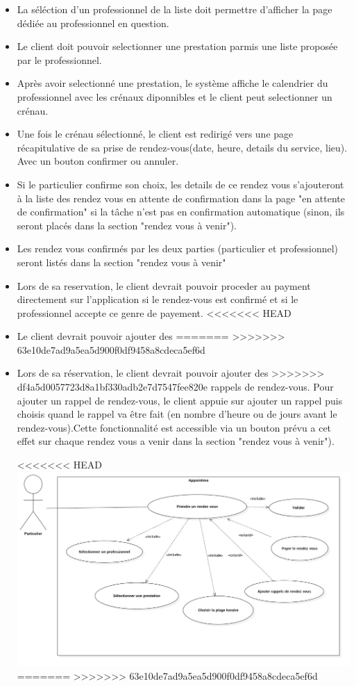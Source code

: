 \documentclass{article}
\begin{document}
\begin{itemize}
\begin{itemize}
\item La séléction d'un
  professionnel de la liste doit permettre d'afficher la
  page dédiée au professionnel en question.
\item Le client doit pouvoir selectionner une prestation parmis une liste
  proposée par le professionnel.
\item Après avoir selectionné une prestation, le système affiche le
  calendrier du professionnel avec les crénaux diponnibles et le
  client peut selectionner un crénau.
\item Une fois le crénau sélectionné, le client est redirigé vers
    une page récapitulative de sa prise de rendez-vous(date, heure, details du service, lieu). Avec un bouton
    confirmer ou annuler.
\item Si le particulier confirme son choix, les details de ce rendez vous s'ajouteront à la liste des rendez 
vous en attente de confirmation dans la page "en attente de confirmation"
si la tâche n'est pas en confirmation automatique (sinon, ils seront placés dans la section "rendez vous à venir").
\item Les rendez vous confirmés par les deux parties (particulier et professionnel) seront listés dans la section "rendez vous à venir"
\item Lors de sa reservation, le client devrait pouvoir proceder au
  payment directement sur l'application si le rendez-vous est confirmé et si le professionnel accepte ce genre de payement.
<<<<<<< HEAD
\item Le client devrait pouvoir ajouter des
=======
>>>>>>> 63e10de7ad9a5ea5d900f0df9458a8cdeca5ef6d
\item Lors de sa réservation, le client devrait pouvoir ajouter des
>>>>>>> df4a5d0057723d8a1bf330adb2e7d7547fee820e
  rappels de rendez-vous. Pour ajouter un rappel de rendez-vous, le
  client appuie sur \og ajouter un rappel \fg{} puis choisis quand le
  rappel va être fait (en nombre d'heure ou de jours avant le
  rendez-vous).Cette fonctionnalité est accessible via un bouton 
  prévu a cet effet sur chaque rendez vous a venir dans la section "rendez vous à venir").

<<<<<<< HEAD
\includegraphics[scale=0.3]{ShematDiagrammes/useCasePriseRdv.jpg}
=======
>>>>>>> 63e10de7ad9a5ea5d900f0df9458a8cdeca5ef6d



\end{itemize}
\end{itemize}
\end{document}
